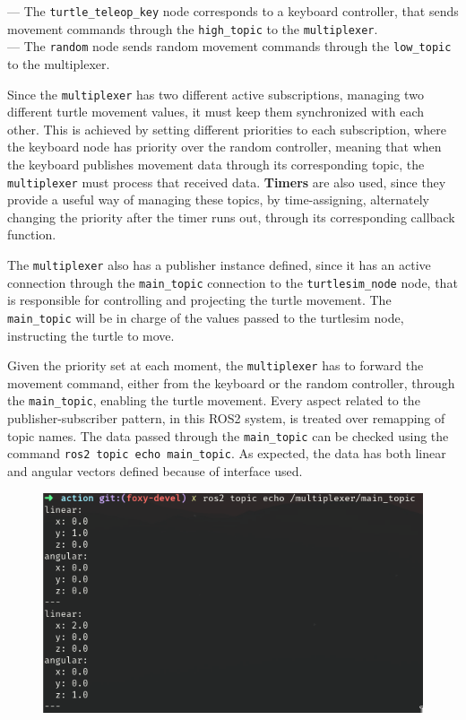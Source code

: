 --- The \texttt{turtle\_teleop\_key} node corresponds to a keyboard controller, that sends movement commands through the \texttt{high\_topic} to the \texttt{multiplexer}.\\
--- The \texttt{random} node sends random movement commands through the \texttt{low\_topic} to the multiplexer.

Since the \texttt{multiplexer} has two different active subscriptions, managing two different turtle movement values, it must keep them synchronized with each other. This is achieved by setting different priorities to each subscription, where the keyboard node has priority over the random controller, meaning that when the keyboard publishes movement data through its corresponding topic, the \texttt{multiplexer} must process that received data. \textbf{Timers} are also used, since they provide a useful way of managing these topics, by time-assigning, alternately changing the priority after the timer runs out, through its corresponding callback function.

The \texttt{multiplexer} also has a publisher instance defined, since it has an active connection through the \texttt{main\_topic} connection to the \texttt{turtlesim\_node} node, that is responsible for controlling and projecting the turtle movement. The \texttt{main\_topic} will be in charge of the values passed to the turtlesim node, instructing the turtle to move.

Given the priority set at each moment, the \texttt{multiplexer} has to forward the movement command, either from the keyboard or the random controller, through the \texttt{main\_topic}, enabling the turtle movement. Every aspect related to the publisher-subscriber pattern, in this ROS2 system, is treated over remapping of topic names. The data passed through the \texttt{main\_topic} can be checked using the command \texttt{ros2 topic echo main\_topic}. As expected, the data has both linear and angular vectors defined because of interface used.

\begin{figure}[H]
        \centering
        \includegraphics[width=0.5\linewidth]{images/ts_main_topicinfo.png}
\end{figure}

